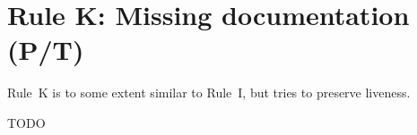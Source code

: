 \section*{Rule K: Missing documentation (P/T)}\label{sec:rule_k}

Rule~K is to some extent similar to Rule~I, but tries to preserve liveness.

TODO
